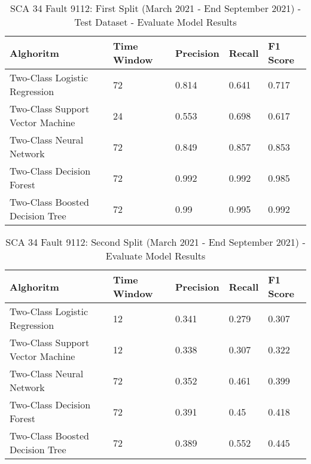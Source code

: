 \begin{table}[!ht]
    \centering
    \begin{tabular}{|l|l|l|l|l|}
    \hline
        Alghoritm & Time Window & Precision & Recall & F1 Score \\ \hline
        Two-Class Logistic Regression & 72 & 0.814 & 0.641 & 0.717 \\ \hline
        Two-Class Support Vector Machine & 24 & 0.553 & 0.698 & 0.617 \\ \hline
        Two-Class Neural Network & 72 & 0.849 & 0.857 & 0.853 \\ \hline
        Two-Class Decision Forest & 72 & 0.992 & 0.992 & 0.985 \\ \hline
        Two-Class Boosted Decision Tree & 72 & 0.99 & 0.995 & 0.992 \\ \hline
    \end{tabular}
    \caption{SCA 34 Fault 9112: First Split (March 2021 - End September 2021) - Test Dataset - Evaluate Model Results}
    \label{9112_SCA34_1st}
\end{table}

\begin{table}[!ht]
    \centering
    \begin{tabular}{|l|l|l|l|l|}
    \hline
        Alghoritm & Time Window & Precision & Recall & F1 Score \\ \hline
        Two-Class Logistic Regression & 12 & 0.341 & 0.279 & 0.307 \\ \hline
        Two-Class Support Vector Machine & 12 & 0.338 & 0.307 & 0.322 \\ \hline
        Two-Class Neural Network & 72 & 0.352 & 0.461 & 0.399 \\ \hline
        Two-Class Decision Forest & 72 & 0.391 & 0.45 & 0.418 \\ \hline
        Two-Class Boosted Decision Tree & 72 & 0.389 & 0.552 & 0.445 \\ \hline
    \end{tabular}
    \caption{SCA 34 Fault 9112: Second Split (March 2021 - End September 2021) - Evaluate Model Results}
    \label{9112_SCA34_2nd}
\end{table}

